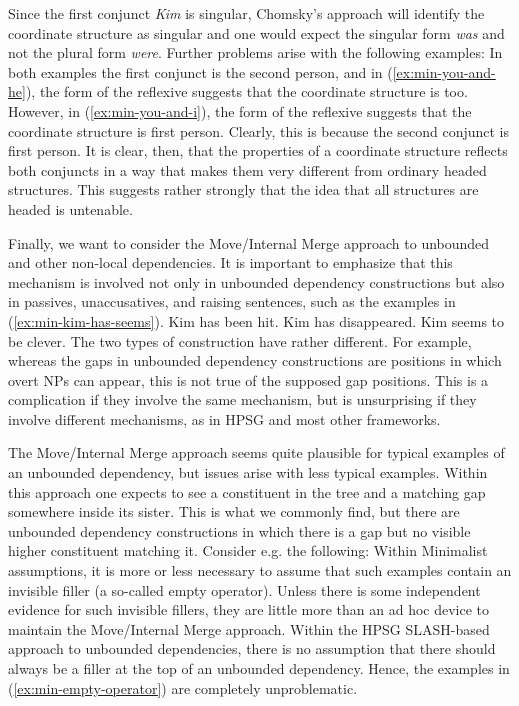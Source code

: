 \documentclass[output=paper]{langsci/langscibook}
\begin{document}
\label{ex:min-kim-lee-late}
\z
Since the first conjunct \textit{Kim} is singular, Chomsky's approach will identify the coordinate structure as singular and one would expect the singular form \textit{was} and not the plural form \textit{were}. Further problems arise with the following examples:
\eal
{}\label{ex:min-you-and-he}
\label{ex:min-you-and-i}
\zl 
In both examples the first conjunct is the second person, and in (\ref{ex:min-you-and-he}), the form of the reflexive suggests that the coordinate structure is too. However, in (\ref{ex:min-you-and-i}), the form of the reflexive suggests that the coordinate structure is first person. Clearly, this is because the second conjunct is first person. It is clear, then, that the properties of a coordinate structure reflects both conjuncts in a way that makes them very different from ordinary headed structures. This suggests rather strongly that the idea that all structures are headed is untenable.

Finally, we want to consider the Move/Internal Merge approach to unbounded and other non-local dependencies. It is important to emphasize that this mechanism is involved not only in unbounded dependency constructions but also in passives, unaccusatives, and raising sentences, such as the examples in (\ref{ex:min-kim-has-seems}).
\eal\label{ex:min-kim-has-seems}
\ex Kim has been hit.
\ex Kim has disappeared.
\ex Kim seems to be clever.
\zl
The two types of construction have rather different. For example, whereas the gaps in unbounded dependency constructions are positions in which overt NPs can appear, this is not true of the supposed gap positions.
\eal
{}
\zl 
This is a complication if they involve the same mechanism, but is unsurprising if they involve different mechanisms, as in HPSG and most other frameworks.

The Move/Internal Merge approach seems quite plausible for typical examples of an unbounded dependency, but issues arise with less typical examples. Within this approach one expects to see a constituent in the tree and a matching gap somewhere inside its sister. This is what we commonly find, but there are unbounded dependency constructions in which there is a gap but no visible higher constituent matching it. Consider e.g. the following:
\eal\label{ex:min-empty-operator}
\zl 
Within Minimalist assumptions, it is more or less necessary to assume that such examples contain an invisible filler (a so-called empty operator). Unless there is some independent evidence for such invisible fillers, they are little more than an ad hoc device to maintain the Move/Internal Merge approach. Within the HPSG SLASH-based approach to unbounded dependencies, there is no assumption that there should always be a filler at the top of an unbounded dependency. Hence, the examples in (\ref{ex:min-empty-operator}) are completely unproblematic.
\end{document}
